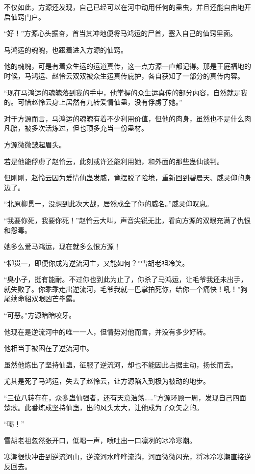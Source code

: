 \begin{this_body}
不仅如此，方源还发现，自己已经可以在河中动用任何的蛊虫，并且还能自由地开启仙窍门户。

“好！”方源心头振奋，首当其冲地便将马鸿运的尸首，塞入自己的仙窍里面。

马鸿运的魂魄，也跟着进入方源的仙窍。

他的魂魄，可是有着众生运的运道真传，这一点方源一直都记得。那是王庭福地的时候，马鸿运、赵怜云双双被众生运真传庇护，各自获知了一部分的真传内容。

“现在马鸿运的魂魄落到我的手中，他掌握的众生运真传的部分内容，自然就是我的。可惜赵怜云身上居然有九转爱情仙蛊，没有俘虏了她。”

对于方源而言，马鸿运的魂魄有着不少利用价值，但他的肉身，虽然也不是什么肉凡胎，被多次活炼过，但也顶多充当一份蛊材。

方源微微皱起眉头。

若是他能俘虏了赵怜云，此刻或许还能利用她，和外面的那些蛊仙谈判。

但刚刚，赵怜云因为爱情仙蛊发威，竟摆脱了险境，重新回到碧晨天、威灵仰的身边了。

“北原柳贯一，没想到此次大战，居然成全了你的威名。”威灵仰叹息。

“我要你死，我要你死！”赵怜云大叫，声音尖锐无比，看向方源的双眼充满了仇恨和怨毒。

她多么爱马鸿运，现在就多么恨方源！

“柳贯一，即便你成为逆流河主，又能如何？”雪胡老祖冷笑。

“臭小子，挺有能耐。不过你也到此为止了，你杀了马鸿运，让毛爷我还未出手，就失败了。你乖乖走出逆流河，毛爷我就一巴掌拍死你，给你一个痛快！吼！”狗尾续命貂双眼凶芒毕露。

“可恶。”方源暗暗咬牙。

他现在是逆流河中的唯一一人，但情势对他而言，并没有多少好转。

他相当于被困在了逆流河中。

虽然他炼出了坚持仙蛊，征服了逆流河，却也不能因此占据主动，扬长而去。

尤其是死了马鸿运，失去了赵怜云，让方源陷入到极为被动的地步。

“三位八转存在，众多蛊仙强者，还有天意浩荡……”方源环顾一周，发现自己四面楚歌。此番炼成坚持仙蛊，出的风头太大，让他成为了众矢之的。

“喝！”

雪胡老祖忽然张开口，低喝一声，喷吐出一口凛冽的冰冷寒潮。

寒潮很快冲击到逆流河山，逆流河水哗哗流淌，河面微微闪光，将冰冷寒潮直接逆反回去。


\end{this_body}
